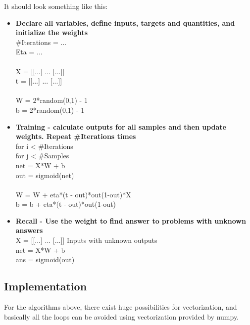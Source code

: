It should look something like this:
\begin{itemize}
	\item \textbf{Declare all variables, define inputs, targets and quantities, and initialize the weights}\\
	\#Iterations = ...\\
	Eta = ...\\
	\\
	X = [[...] ... [...]]\\
	t = [[...] ... [...]]\\
	\\
	W = 2*random(0,1) - 1\\
	b = 2*random(0,1) - 1\\
	
	\item \textbf{Training - calculate outputs for all samples and then update weights. Repeat \#Iterations times}\\
	for i < \#Iterations\\
	for j < \#Samples\\
	net = X*W + b\\
	out = sigmoid(net)\\
	\\
	W = W + eta*(t - out)*out(1-out)*X\\
	b = b + eta*(t - out)*out(1-out)\\
	
	\item \textbf{Recall - Use the weight to find answer to problems with unknown answers}\\
	X = [[...] ... [...]]		Inputs with unknown outputs\\
	net = X*W + b\\
	ans = sigmoid(out)\\
\end{itemize}

\subsection{Implementation}
For the algorithms above, there exist huge possibilities for vectorization, and basically all the loops can be avoided using vectorization provided by numpy. 

